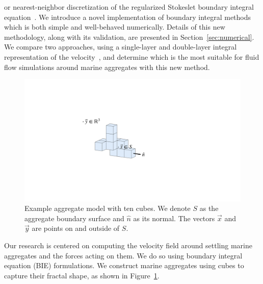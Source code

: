 or nearest-neighbor discretization of the regularized Stokeslet boundary integral equation~\cite{smith_nearest-neighbour_2018}.
 We introduce a novel implementation of boundary integral methods which is both simple and well-behaved numerically. 
Details of this new methodology, along with its validation, are presented in Section~\ref{sec:numerical}. We compare two approaches, using a single-layer and double-layer integral representation of the velocity~\cite{pozrikidis_boundary_1992, power_second_1987, ingber_comparison_1999}, and determine which is the most suitable for fluid flow simulations around marine aggregates with this new method.
\begin{figure}[ht]

	\begin{center}
		\includegraphics[scale=0.3]{figures/fig_sample_cube10.pdf}

	\caption{Example aggregate model with ten cubes. We denote $S$ as the aggregate boundary surface and $\hat{n}$ as its normal. The vectors $\vec{x}$ and $\vec{y}$ are points on and outside of $S$.} 

\label{fig_cube10}
\end{center}
\end{figure}
 \par
Our research is centered on computing the velocity field around settling marine aggregates and the forces acting on them. We do so using boundary integral equation (BIE) formulations. We construct marine aggregates using cubes to capture their fractal shape, as shown in Figure~\ref{fig_cube10}. 

